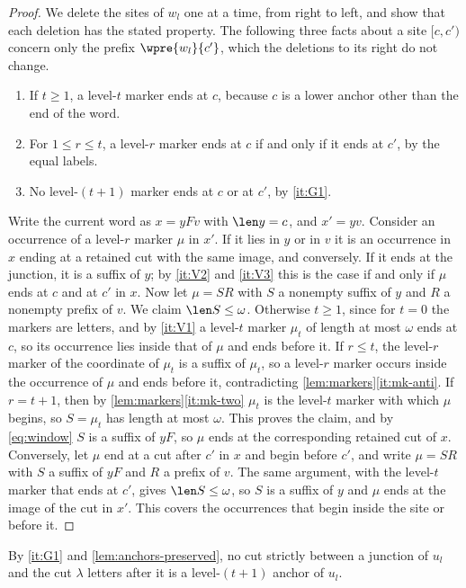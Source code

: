 \begin{proof}
We delete the sites of $w_l$ one at a time, from right to left, and show
that each deletion has the stated property. The following three facts about
a site $[c,c')$ concern only the prefix $\wpre{w_l}{c'}$, which the
deletions to its right do not change.
\begin{enumerate}[label=\textup{(V\arabic*)}]
\item\label{it:V1} If $t\ge1$, a level-$t$ marker ends at $c$, because $c$
  is a lower anchor other than the end of the word.
\item\label{it:V2} For $1\le r\le t$, a level-$r$ marker ends at $c$ if and
  only if it ends at $c'$, by the equal labels.
\item\label{it:V3} No level-$(t+1)$ marker ends at $c$ or at $c'$, by
  \ref{it:G1}.
\end{enumerate}
Write the current word as $x=yFv$ with $\len y=c$, and $x'=yv$. Consider an
occurrence of a level-$r$ marker $\mu$ in $x'$. If it lies in $y$ or in $v$
it is an occurrence in $x$ ending at a retained cut with the same image,
and conversely. If it ends at the junction, it is a suffix of $y$; by
\ref{it:V2} and \ref{it:V3} this is the case if and only if $\mu$ ends at
$c$ and at $c'$ in $x$. Now let $\mu=SR$ with $S$ a nonempty suffix of $y$
and $R$ a nonempty prefix of $v$. We claim $\len S\le\omega$. Otherwise
$t\ge1$, since for $t=0$ the markers are letters, and by \ref{it:V1} a
level-$t$ marker $\mu_t$ of length at most $\omega$ ends at $c$, so its
occurrence lies inside that of $\mu$ and ends before it. If $r\le t$, the
level-$r$ marker of the coordinate of $\mu_t$ is a suffix of $\mu_t$, so a
level-$r$ marker occurs inside the occurrence of $\mu$ and ends before it,
contradicting \cref{lem:markers}\eqref{it:mk-anti}. If $r=t+1$, then by
\cref{lem:markers}\eqref{it:mk-two} $\mu_t$ is the level-$t$ marker with
which $\mu$ begins, so $S=\mu_t$ has length at most $\omega$. This proves
the claim, and by \eqref{eq:window} $S$ is a suffix of $yF$, so $\mu$ ends
at the corresponding retained cut of $x$. Conversely, let $\mu$ end at a cut
after $c'$ in $x$ and begin before $c'$, and write $\mu=SR$ with $S$ a
suffix of $yF$ and $R$ a prefix of $v$. The same argument, with the
level-$t$ marker that ends at $c'$, gives $\len S\le\omega$, so $S$ is a
suffix of $y$ and $\mu$ ends at the image of the cut in $x'$. This covers
the occurrences that begin inside the site or before it.
\end{proof}

By \ref{it:G1} and \cref{lem:anchors-preserved}, no cut strictly between a
junction of $u_l$ and the cut $\lambda$ letters after it is a level-$(t+1)$
anchor of $u_l$.

